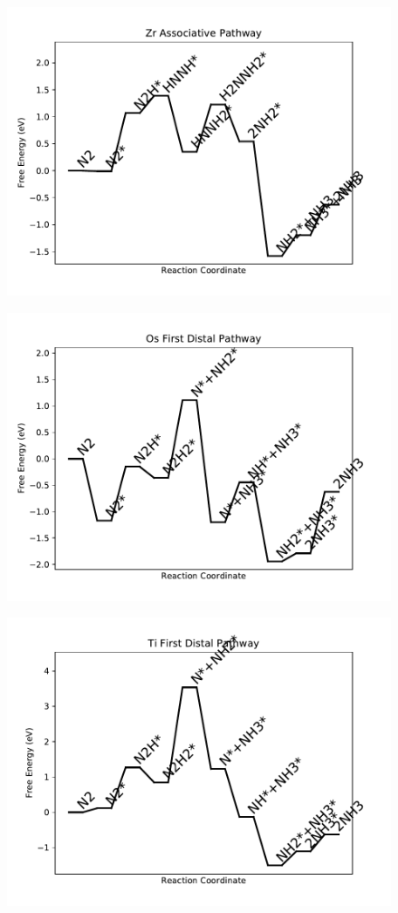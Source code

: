 \begin{figure}
\includegraphics[width=0.8\linewidth]{data/plots/Zr_associative.pdf}
\label{fig:Zr_associative}
\end{figure}

\begin{figure}
\includegraphics[width=0.8\linewidth]{data/plots/Os_distal_1.pdf}
\label{fig:Os_distal_1}
\end{figure}

\begin{figure}
\includegraphics[width=0.8\linewidth]{data/plots/Ti_distal_1.pdf}
\label{fig:Ti_distal_1}
\end{figure}

